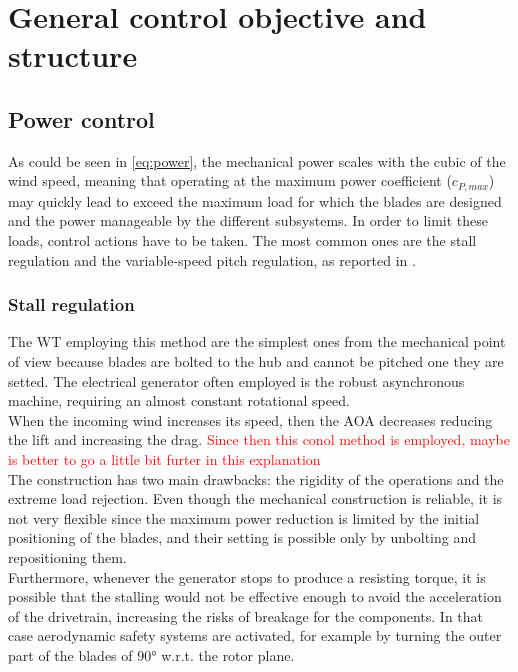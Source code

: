 \section{General control objective and structure} \label{sec:control_objective}
\subsection{Power control}
As could be seen in \autoref{eq:power}, the mechanical power scales with the cubic of the wind speed, meaning that operating at the maximum power coefficient ($c_{P, max}$) may quickly lead to exceed the maximum load for which the blades are designed and the power manageable by the different subsystems. In order to limit these loads, control actions have to be taken. The most common ones are the stall regulation and the variable-speed pitch regulation, as reported in \cite{Aerodynamics_of_wind_turbines}.
\subsubsection{Stall regulation}\label{subsec:stall_regulation_theory}
The \acrshort{WT} employing this method are the simplest ones from the mechanical point of view because blades are bolted to the hub and cannot be pitched one they are setted. The electrical generator often employed is the robust asynchronous machine, requiring an almost constant rotational speed.\\
When the incoming wind increases its speed, then the \acrshort{AOA} decreases reducing the lift and increasing the drag. \textcolor{red}{Since then this conol method is employed, maybe is better to go a little bit furter in this explanation}\\
The construction has two main drawbacks: the rigidity of the operations and the extreme load rejection. Even though the mechanical construction is reliable, it is not very flexible since the maximum power reduction is limited by the initial positioning of the blades, and their setting is possible only by unbolting and repositioning them.\\
Furthermore, whenever the generator stops to produce a resisting torque, it is possible that the stalling would not be effective enough to avoid the acceleration of the drivetrain, increasing the risks of breakage for the components. In that case aerodynamic safety systems are activated, for example by turning the outer part of the blades of 90$\si{\degree}$ w.r.t. the rotor plane. 

